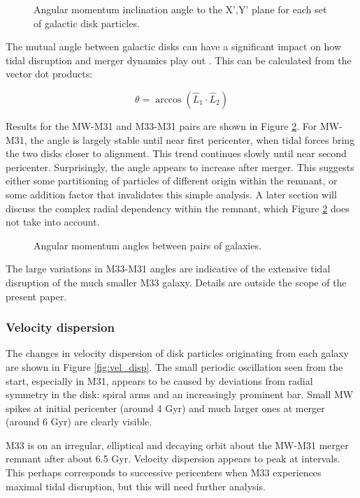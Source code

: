 \documentclass[twocolumn]{aastex63}
\newcommand{\todo}{\color{red}{TODO}\color{black}\hspace{2mm}}
\begin{document}
\begin{figure}[ht!]
	\caption{Angular momentum inclination angle to the X',Y' plane for each set of galactic disk particles.
		\label{fig:inclinations_xy}}
\end{figure}

The mutual angle between galactic disks can have a significant impact on how tidal disruption and merger dynamics play out \todo{ref?}. This can be calculated from the vector dot products:

\[ \theta = \arccos (\hat{L}_1 \cdot \hat{L}_2 ) \]

Results for the MW-M31 and M33-M31 pairs are shown in Figure \ref{fig:inclinations_mutual}. For MW-M31, the angle is largely stable until near first pericenter, when tidal forces bring the two disks closer to alignment. This trend continues slowly until near second pericenter. Surprisingly, the angle appears to increase after merger. This suggests either some partitioning of particles of different origin within the remnant, or some addition factor that invalidates this simple analysis. A later section will discuss the complex radial dependency within the remnant, which Figure \ref{fig:inclinations_mutual} does not take into account.

\begin{figure}[ht!]
	\caption{Angular momentum angles between pairs of galaxies.
		\label{fig:inclinations_mutual}}
\end{figure}

The large variations in M33-M31 angles are indicative of the extensive tidal disruption of the much smaller M33 galaxy. Details are outside the scope of the present paper.

\subsubsection{Velocity dispersion}

The changes in velocity dispersion of disk particles originating from each galaxy are shown in Figure \ref{fig:vel_disp}. The small periodic oscillation seen from the start, especially in M31, appears to be caused by deviations from radial symmetry in the disk: spiral arms and an increasingly prominent bar. Small MW spikes at initial pericenter (around 4 Gyr) and much larger ones at merger (around 6 Gyr) are clearly visible.

M33 is on an irregular, elliptical and decaying orbit about the MW-M31 merger remnant after about 6.5 Gyr. Velocity dispersion appears to peak at intervals. This perhaps corresponds to successive pericenters when M33 experiences maximal tidal disruption, but this will need further analysis.
\end{document}
